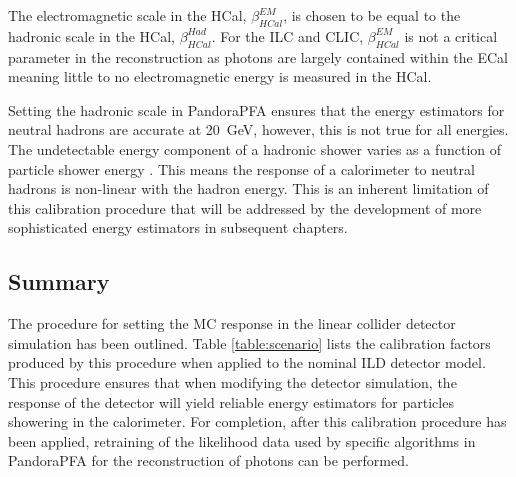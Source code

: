 The electromagnetic scale in the HCal, $\beta^{EM}_{HCal}$, is chosen to be equal to the hadronic scale in the HCal, $\beta^{Had}_{HCal}$.  For the ILC and CLIC, $\beta^{EM}_{HCal}$ is not a critical parameter in the reconstruction as photons are largely contained within the ECal meaning little to no electromagnetic energy is measured in the HCal.  

Setting the hadronic scale in PandoraPFA ensures that the energy estimators for neutral hadrons are accurate at 20~GeV, however, this is not true for all energies.  The undetectable energy component of a hadronic shower varies as a function of particle shower energy \cite{Wigmans:2000vf}.  This means the response of a calorimeter to neutral hadrons is non-linear with the hadron energy.  This is an inherent limitation of this calibration procedure that will be addressed by the development of more sophisticated energy estimators in subsequent chapters.  


\subsection{Summary}
The procedure for setting the MC response in the linear collider detector simulation has been outlined.  {Table \ref{table:scenario} lists the calibration factors produced by this procedure when applied to the nominal ILD detector model.}  This procedure ensures that when modifying the detector simulation, the response of the detector will yield reliable energy estimators for particles showering in the calorimeter.  For completion, after this calibration procedure has been applied, retraining of the likelihood data used by specific algorithms in PandoraPFA for the reconstruction of photons can be performed.  

